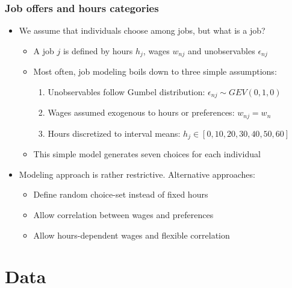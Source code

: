 \documentclass[handout,intlimits]{beamer}
\def\litf#1{\textcolor{med-gray}{\tiny\citep*{#1}}}
\def\blue#1{\textcolor{zewblue}{#1}}
\begin{document}
\begin{frame}
\frametitle{Job offers and hours categories}
\begin{itemize}
	\item \blue{We assume that individuals choose among jobs, but what is a job?}
	\begin{itemize}
		\item A job $j$ is defined by hours $h_j$, wages $w_{nj}$ and unobservables $\epsilon_{nj}$
		\smallskip
		\item Most often, job modeling boils down to three simple assumptions:
		\begin{enumerate}
			\item Unobservables follow Gumbel distribution: \blue{$\epsilon_{nj}\sim GEV(0,1,0)$}
			\smallskip
			\item Wages assumed exogenous to hours or preferences: \blue{$w_{nj}=w_n$}
			\smallskip
			\item Hours discretized to interval means: \blue{$h_j\in[0, 10, 20, 30, 40, 50, 60]$}
		\end{enumerate}
		\litf{vansoest_1995, hoynes_1996, keane_moffitt_1998, euwals_vansoest_1999, blundell_etal_2000, vansoest_etal_2002, bargain_etal_2014}
		\smallskip
		\item This simple model generates seven choices for each individual
	\end{itemize}
	\bigskip
	\item \blue{Modeling approach is rather restrictive.} Alternative approaches:
	\begin{itemize}
		\item Define random choice-set instead of fixed hours \litf{aaberge_etal_2009}
		\smallskip
		\item Allow correlation between wages and preferences \litf{blundell_shephard_2012}
		\smallskip
		\item Allow hours-dependent wages and flexible correlation \litf{loeffler_etal_2014}
	\end{itemize}
\end{itemize}
\end{frame}


\section{Data}
\end{document}
